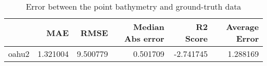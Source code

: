 \begin{table}[h!]
\caption{Error between the point bathymetry and ground-truth data}
\label{tab:oahu2_lidar_error}
\begin{tabular}{lrrrrr}
\toprule
 & MAE & RMSE & Median Abs error & R2 Score & Average Error \\
\midrule
oahu2 & 1.321004 & 9.500779 & 0.501709 & -2.741745 & 1.288169 \\
\bottomrule
\end{tabular}
\end{table}
